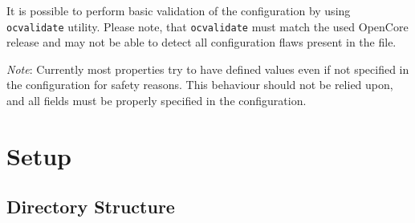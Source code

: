 \documentclass[]{article}
\begin{document}
It is possible to perform basic validation of the configuration by using
\texttt{ocvalidate} utility. Please note, that \texttt{ocvalidate}
must match the used OpenCore release and may not be able to detect all
configuration flaws present in the file.

\emph{Note}: Currently most properties try to have defined values even if not
specified in the configuration for safety reasons. This behaviour should not
be relied upon, and all fields must be properly specified in the configuration.

\section{Setup}\label{setup-overview}

\subsection{Directory Structure}\label{directory-structure}
\end{document}

